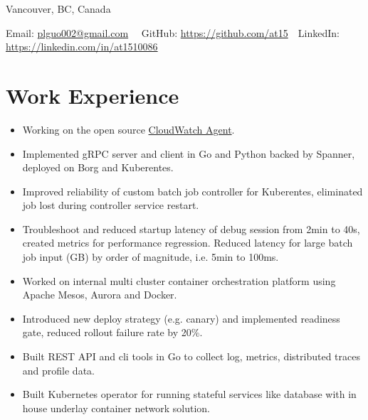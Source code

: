 \documentclass[11pt, letterpaper]{simple-cv}
\begin{document}
\centerline{
	Vancouver, BC, Canada\ \
}
\centerline{
	Email: \href{plguo002@gmail.com}{plguo002@gmail.com}\ \
	GitHub: \href{https://github.com/at15}{https://github.com/at15}\ \
	LinkedIn: \href{https://www.linkedin.com/in/at1510086}{https://linkedin.com/in/at1510086}}

\section{Work Experience}

\begin{itemize}
	\item Working on the open source \href{https://github.com/aws/amazon-cloudwatch-agent}{CloudWatch Agent}.
\end{itemize}

\begin{itemize}
	\item Implemented gRPC server and client in Go and Python backed by Spanner, deployed on Borg and Kuberentes.
	\item Improved reliability of custom batch job controller for Kuberentes, eliminated job lost during controller service restart.
	\item Troubleshoot and reduced startup latency of debug session from 2min to 40s, created metrics for performance regression.
	Reduced latency for large batch job input (GB) by order of magnitude, i.e. 5min to 100ms.
\end{itemize}

\begin{itemize}
	\item Worked on internal multi cluster container orchestration platform using Apache Mesos, Aurora and Docker.
	\item Introduced new deploy strategy (e.g. canary) and implemented readiness gate, reduced rollout failure rate by 20\%.
	\item Built REST API and cli tools in Go to collect log, metrics, distributed traces and profile data.
	\item Built Kubernetes operator for running stateful services like database with in house underlay container network solution.
\end{itemize}
\end{document}
